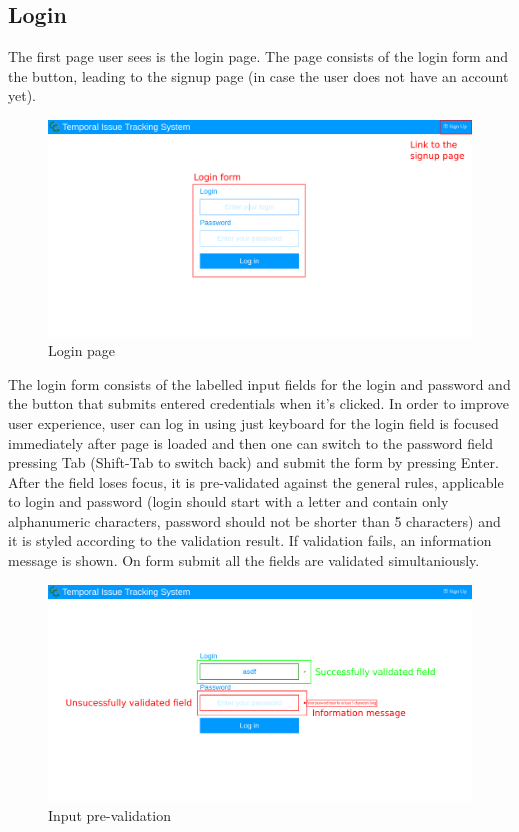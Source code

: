 \documentclass{article}
\begin{document}
\subsection{Login}
The first page user sees is the login page. The page consists of the login form and the button, leading to the signup page (in case the user does not have an account yet).
\begin{figure}[H]
    \includegraphics[width=\textwidth]{img/login.png}
    \caption{Login page}
\end{figure}
The login form consists of the labelled input fields for the login and password and the button that submits entered credentials when it's clicked. In order to improve user experience, user can log in using just keyboard for the login field is focused immediately after page is loaded and then one can switch to the password field pressing Tab (Shift-Tab to switch back) and submit the form by pressing Enter. After the field loses focus, it is pre-validated against the general rules, applicable to login and password (login should start with a letter and contain only alphanumeric characters, password should not be shorter than 5 characters) and it is styled according to the validation result. If validation fails, an information message is shown. On form submit all the fields are validated simultaniously.
\begin{figure}[H]
    \includegraphics[width=\textwidth]{img/loginvalidation.png}
    \caption{Input pre-validation}
\end{figure}
\end{document}
